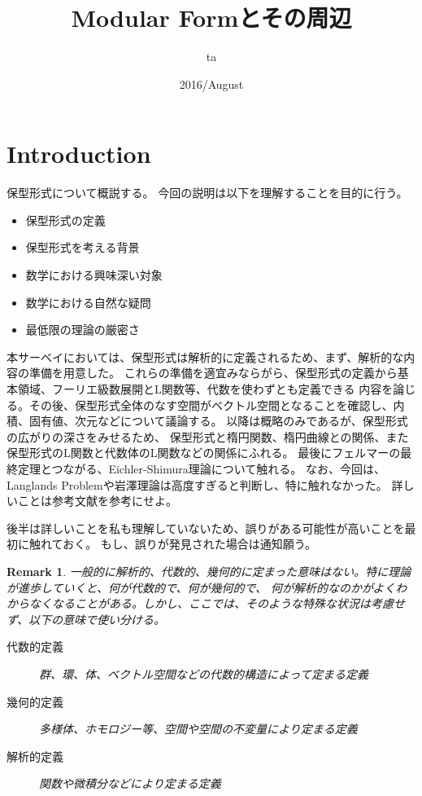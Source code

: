 \documentclass{ujarticle}
\title{Modular Formとその周辺}
\author{ta}
\date{2016/August}
\newtheorem*{rem}{Remark}
\begin{document}
\maketitle
\section{Introduction}
\label{sec:Introduction}

保型形式について概説する。
今回の説明は以下を理解することを目的に行う。
\begin{itemize}
  \setlength{\parskip}{0cm} %
  \setlength{\itemsep}{0cm} %


  \item 保型形式の定義
  \item 保型形式を考える背景
  \item 数学における興味深い対象
  \item 数学における自然な疑問
  \item 最低限の理論の厳密さ
\end{itemize}

本サーベイにおいては、保型形式は解析的に定義されるため、まず、解析的な内容の準備を用意した。
これらの準備を適宜みならがら、保型形式の定義から基本領域、フーリエ級数展開とL関数等、代数を使わずとも定義できる
内容を論じる。その後、保型形式全体のなす空間がベクトル空間となることを確認し、内積、固有値、次元などについて議論する。
以降は概略のみであるが、保型形式の広がりの深さをみせるため、
保型形式と楕円関数、楕円曲線との関係、また保型形式のL関数と代数体のL関数などの関係にふれる。
最後にフェルマーの最終定理とつながる、Eichler-Shimura理論について触れる。
なお、今回は、Langlands Problemや岩澤理論は高度すぎると判断し、特に触れなかった。
詳しいことは参考文献を参考にせよ。

後半は詳しいことを私も理解していないため、誤りがある可能性が高いことを最初に触れておく。
もし、誤りが発見された場合は通知願う。



\begin{rem}
  一般的に解析的、代数的、幾何的に定まった意味はない。特に理論が進歩していくと、何が代数的で、何が幾何的で、
  何が解析的なのかがよくわからなくなることがある。しかし、ここでは、そのような特殊な状況は考慮せず、以下の意味で使い分ける。
　\begin{description}
    \item[代数的定義] 群、環、体、ベクトル空間などの代数的構造によって定まる定義
    \item[幾何的定義] 多様体、ホモロジー等、空間や空間の不変量により定まる定義
    \item[解析的定義] 関数や微積分などにより定まる定義
　\end{description}
\end{rem}
\end{document}

